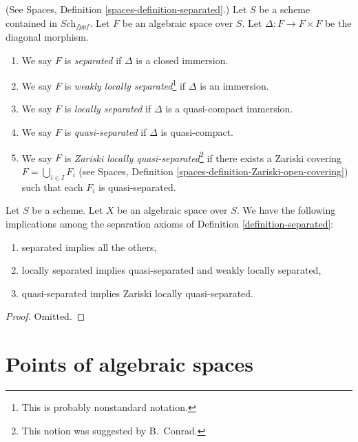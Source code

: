 \begin{definition}
\label{definition-separated}
(See Spaces, Definition \ref{spaces-definition-separated}.)
Let $S$ be a scheme contained in $\textit{Sch}_{fppf}$.
Let $F$ be an algebraic space over $S$.
Let $\Delta : F \to F \times F$ be the diagonal morphism.
\begin{enumerate}
\item We say $F$ is {\it separated} if $\Delta$ is a closed immersion.
\item We say $F$ is {\it weakly locally separated}\footnote{This is probably
nonstandard notation.} if $\Delta$ is an
immersion.
\item We say $F$ is {\it locally separated} if $\Delta$ is a
quasi-compact immersion.
\item We say $F$ is {\it quasi-separated} if $\Delta$ is quasi-compact.
\item We say $F$ is {\it Zariski locally quasi-separated}\footnote{
This notion was suggested by B.\ Conrad.} if there
exists a Zariski covering $F = \bigcup_{i \in I} F_i$ (see Spaces,
Definition \ref{spaces-definition-Zariski-open-covering}) such that
each $F_i$ is quasi-separated.
\end{enumerate}
\end{definition}

\begin{lemma}
\label{lemma-trivial-implications}
Let $S$ be a scheme.
Let $X$ be an algebraic space over $S$.
We have the following implications among the separation axioms
of Definition \ref{definition-separated}:
\begin{enumerate}
\item separated implies all the others,
\item locally separated implies quasi-separated and weakly locally separated,
\item quasi-separated implies Zariski locally quasi-separated.
\end{enumerate}
\end{lemma}

\begin{proof}
Omitted.
\end{proof}














\section{Points of algebraic spaces}
\label{section-points}

